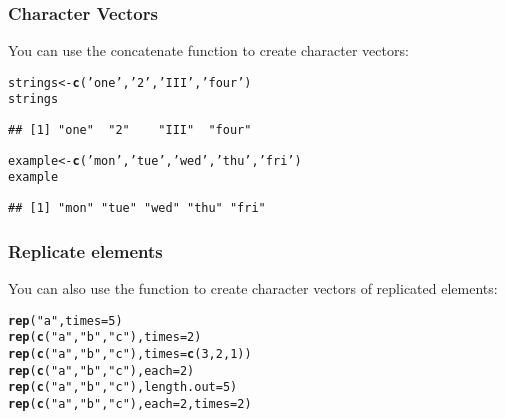 \documentclass[12pt]{beamer}\usepackage[]{graphicx}\usepackage[]{color}
\makeatletter
\newcommand{\hlnum}[1]{\textcolor[rgb]{0.686,0.059,0.569}{#1}}%
\newcommand{\hlstr}[1]{\textcolor[rgb]{0.192,0.494,0.8}{#1}}%
\newcommand{\hlstd}[1]{\textcolor[rgb]{0.345,0.345,0.345}{#1}}%
\newcommand{\hlkwb}[1]{\textcolor[rgb]{0.69,0.353,0.396}{#1}}%
\newcommand{\hlkwc}[1]{\textcolor[rgb]{0.333,0.667,0.333}{#1}}%
\newcommand{\hlkwd}[1]{\textcolor[rgb]{0.737,0.353,0.396}{\textbf{#1}}}%
\newenvironment{kframe}{%
 \def\at@end@of@kframe{}%
 \ifinner\ifhmode%
  \def\at@end@of@kframe{\end{minipage}}%
  \begin{minipage}{\columnwidth}%
 \fi\fi%
 \def\FrameCommand##1{\hskip\@totalleftmargin \hskip-\fboxsep
 \colorbox{shadecolor}{##1}\hskip-\fboxsep
     \hskip-\linewidth \hskip-\@totalleftmargin \hskip\columnwidth}%
 \MakeFramed {\advance\hsize-\width
   \@totalleftmargin\z@ \linewidth\hsize
   \@setminipage}}%
 {\par\unskip\endMakeFramed%
 \at@end@of@kframe}
\newenvironment{knitrout}{}{} %
\makeatother
\begin{document}
\begin{frame}[fragile]
\frametitle{Character Vectors}

You can use the concatenate function {\hilit {}} to create character vectors:
\begin{knitrout}\footnotesize
{}\color{fgcolor}\begin{kframe}
\begin{alltt}
\hlstd{strings} \hlkwb{<-} \hlkwd{c}\hlstd{(}\hlstr{'one'}\hlstd{,} \hlstr{'2'}\hlstd{,} \hlstr{'III'}\hlstd{,} \hlstr{'four'}\hlstd{)}
\hlstd{strings}
\end{alltt}
\begin{verbatim}
## [1] "one"  "2"    "III"  "four"
\end{verbatim}
\begin{alltt}
\hlstd{example} \hlkwb{<-} \hlkwd{c}\hlstd{(}\hlstr{'mon'}\hlstd{,} \hlstr{'tue'}\hlstd{,} \hlstr{'wed'}\hlstd{,} \hlstr{'thu'}\hlstd{,} \hlstr{'fri'}\hlstd{)}
\hlstd{example}
\end{alltt}
\begin{verbatim}
## [1] "mon" "tue" "wed" "thu" "fri"
\end{verbatim}
\end{kframe}
\end{knitrout}

\end{frame}


\begin{frame}[fragile]
\frametitle{Replicate elements}

You can also use the function {\hilit {}} to create character vectors of replicated elements:
\begin{knitrout}\footnotesize
{}\color{fgcolor}\begin{kframe}
\begin{alltt}
\hlkwd{rep}\hlstd{(}\hlstr{"a"}\hlstd{,} \hlkwc{times} \hlstd{=} \hlnum{5}\hlstd{)}
\hlkwd{rep}\hlstd{(}\hlkwd{c}\hlstd{(}\hlstr{"a"}\hlstd{,} \hlstr{"b"}\hlstd{,} \hlstr{"c"}\hlstd{),} \hlkwc{times} \hlstd{=} \hlnum{2}\hlstd{)}
\hlkwd{rep}\hlstd{(}\hlkwd{c}\hlstd{(}\hlstr{"a"}\hlstd{,} \hlstr{"b"}\hlstd{,} \hlstr{"c"}\hlstd{),} \hlkwc{times} \hlstd{=} \hlkwd{c}\hlstd{(}\hlnum{3}\hlstd{,} \hlnum{2}\hlstd{,} \hlnum{1}\hlstd{))}
\hlkwd{rep}\hlstd{(}\hlkwd{c}\hlstd{(}\hlstr{"a"}\hlstd{,} \hlstr{"b"}\hlstd{,} \hlstr{"c"}\hlstd{),} \hlkwc{each} \hlstd{=} \hlnum{2}\hlstd{)}
\hlkwd{rep}\hlstd{(}\hlkwd{c}\hlstd{(}\hlstr{"a"}\hlstd{,} \hlstr{"b"}\hlstd{,} \hlstr{"c"}\hlstd{),} \hlkwc{length.out} \hlstd{=} \hlnum{5}\hlstd{)}
\hlkwd{rep}\hlstd{(}\hlkwd{c}\hlstd{(}\hlstr{"a"}\hlstd{,} \hlstr{"b"}\hlstd{,} \hlstr{"c"}\hlstd{),} \hlkwc{each} \hlstd{=} \hlnum{2}\hlstd{,} \hlkwc{times} \hlstd{=} \hlnum{2}\hlstd{)}
\end{alltt}
\end{kframe}
\end{knitrout}

\end{frame}
\end{document}
